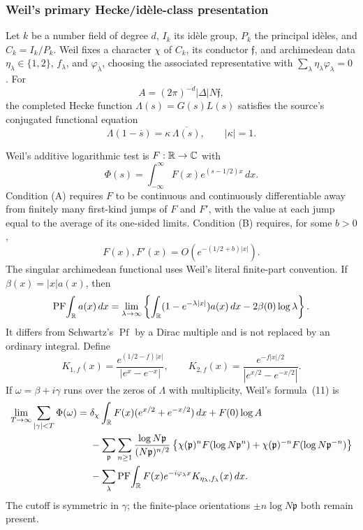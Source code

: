 \subsubsection{Weil's primary Hecke/id\`ele-class presentation}

Let $k$ be a number field of degree $d$, $I_k$ its id\`ele group, $P_k$ the principal
id\`eles, and $C_k=I_k/P_k$.  Weil fixes a character $\chi$ of $C_k$, its conductor
$\mathfrak f$, and archimedean data $\eta_\lambda\in\{1,2\}$,
$f_\lambda$, and $\varphi_\lambda$, choosing the associated representative with
$\sum_\lambda\eta_\lambda\varphi_\lambda=0$
\cite[Collected Papers II, pp.~48--52, eqs.~(1)--(7)]{weil1952}.  For
\[
 A=(2\pi)^{-d}|\Delta|N\mathfrak f,
\]
the completed Hecke function $\Lambda(s)=G(s)L(s)$ satisfies the source's conjugated
functional equation
\[
 \Lambda(1-\overline{s})=\kappa\,\overline{\Lambda(s)},
 \qquad |\kappa|=1.
\]

Weil's additive logarithmic test is $F:\mathbb R\to\mathbb C$ with
\begin{equation}
 \Phi(s)=\int_{-\infty}^{\infty}F(x)e^{(s-1/2)x}\,dx.
 \label{eq:weil-Phi}
\end{equation}
Condition (A) requires $F$ to be continuous and continuously differentiable away from
finitely many first-kind jumps of $F$ and $F'$, with the value at each jump equal to the
average of its one-sided limits.  Condition (B) requires, for some $b>0$,
\[
 F(x),F'(x)=O\!\left(e^{-(1/2+b)|x|}\right).
\]
The singular archimedean functional uses Weil's literal finite-part convention.  If
$\beta(x)=|x|a(x)$, then
\begin{equation}
 \operatorname{PF}\!\int_\mathbb R a(x)\,dx
 =\lim_{\lambda\to\infty}\left\{
 \int_\mathbb R(1-e^{-\lambda|x|})a(x)\,dx-2\beta(0)\log\lambda\right\}.
 \label{eq:weil-PF}
\end{equation}
It differs from Schwartz's $\operatorname{Pf}$ by a Dirac multiple and is not replaced by an
ordinary integral.  Define
\begin{equation}
 K_{1,f}(x)=\frac{e^{(1/2-f)|x|}}{|e^x-e^{-x}|},
 \qquad
 K_{2,f}(x)=\frac{e^{-f|x|/2}}{|e^{x/2}-e^{-x/2}|}.
 \label{eq:weil-kernels}
\end{equation}
If $\omega=\beta+i\gamma$ runs over the zeros of $\Lambda$ with multiplicity, Weil's
formula~(11) is~\cite[Collected Papers II, pp.~57--58, eq.~(11)]{weil1952}
\begin{align}
 \lim_{T\to\infty}\sum_{|\gamma|<T}\Phi(\omega)
 ={}&\delta_\chi\int_\mathbb R F(x)(e^{x/2}+e^{-x/2})\,dx+F(0)\log A \notag\\
 &-\sum_{\mathfrak p}\sum_{n\geq1}
 \frac{\log N\mathfrak p}{(N\mathfrak p)^{n/2}}
 \left\{\chi(\mathfrak p)^nF(\log N\mathfrak p^n)
 +\chi(\mathfrak p)^{-n}F(\log N\mathfrak p^{-n})\right\}\notag\\
 &-\sum_\lambda\operatorname{PF}\!\int_\mathbb R
 F(x)e^{-i\varphi_\lambda x}K_{\eta_\lambda,f_\lambda}(x)\,dx.
 \label{eq:weil-11}
\end{align}
The cutoff is symmetric in $\gamma$; the finite-place orientations $\pm n\log N\mathfrak p$
both remain present.

